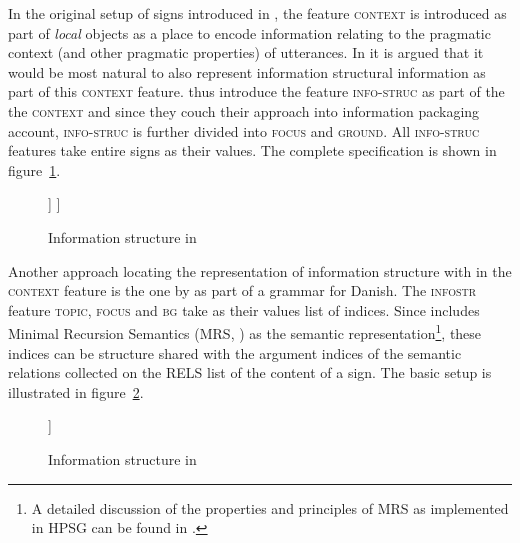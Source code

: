 \documentclass[output=paper]{langsci/langscibook}
\begin{document}
In the original setup of signs introduced in \cite{ps2}, the feature
\textsc{context} is introduced as part of \textit{local} objects as a
place to encode information relating to the pragmatic context (and
other pragmatic properties) of utterances. In \cite{EV96a} it is
argued that it would be most natural to also represent information
structural information as part of this \textsc{context}
feature. \cite{EV96a} thus introduce the feature \textsc{info-struc}
as part of the the \textsc{context} and since they couch their
approach into \cite{vallduvi:92} information packaging account,
\textsc{info-struc} is further divided into \textsc{focus} and
\textsc{ground}. All \textsc{info-struc} features take entire signs as
their values. The complete specification is shown in
figure~\ref{fig:e-v-info-struc}.

\begin{figure}[htb!]
  \begin{center}
        \leavevmode
    \begin{avm}
    [\tp{sign}\\
     synsem|local|context|info-struc & [focus & sign\\
                                        ground & [link & sign\\
                                                  tail & sign]
                                       ]
    ]     
    \end{avm}
    \caption{Information structure in \cite{EV96a}}
    \label{fig:e-v-info-struc}
  \end{center}
\end{figure}

Another approach locating the representation of information structure
with in the \textsc{context} feature is the one by
\cite{Paggio2009a-u} as part of a grammar for Danish. The
\textsc{infostr} feature \textsc{topic}, \textsc{focus} and
\textsc{bg} take as their values list of indices. Since
\cite{Paggio2009a-u} includes Minimal Recursion Semantics (MRS,
\citep{CFPS2005a}) as the semantic representation\footnote{A detailed
  discussion of the properties and principles of MRS as implemented in
  HPSG can be found in .}, these indices
can be structure shared with the argument indices of the semantic
relations collected on the \textsc{RELS} list of the content of a
sign. The basic setup is illustrated in
figure~\ref{fig:paggio-infostr}.
\begin{figure}[htb]
  \centering
        \leavevmode
    \begin{avm}
    [\tp{sign}\\
     synsem|local|context|infostr & [focus & list-of-indices\\
                                     topic & list-fo-indices\\
                                     bg & list-of-indices]
    ]     
    \end{avm}
  \caption{Information structure in \cite{Paggio2009a-u}}
  \label{fig:paggio-infostr}
\end{figure}
\end{document}
